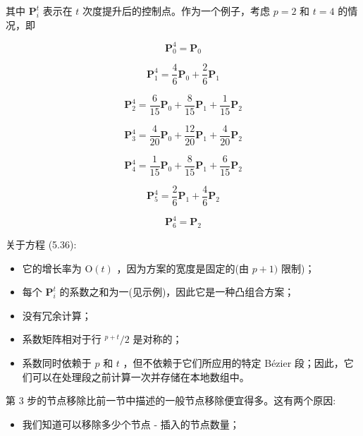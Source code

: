 \documentclass[../main.tex]{subfiles}
\begin{document}
其中 \({\mathbf{P}}_{i}^{t}\) 表示在 \(t\) 次度提升后的控制点。作为一个例子，考虑 \(p = 2\) 和 \(t = 4\) 的情况，即

\[
{\mathbf{P}}_{0}^{4} = {\mathbf{P}}_{0}
\]

\[
{\mathbf{P}}_{1}^{4} = \frac{4}{6}{\mathbf{P}}_{0} + \frac{2}{6}{\mathbf{P}}_{1}
\]

\[
{\mathbf{P}}_{2}^{4} = \frac{6}{15}{\mathbf{P}}_{0} + \frac{8}{15}{\mathbf{P}}_{1} + \frac{1}{15}{\mathbf{P}}_{2}
\]

\[
{\mathbf{P}}_{3}^{4} = \frac{4}{20}{\mathbf{P}}_{0} + \frac{12}{20}{\mathbf{P}}_{1} + \frac{4}{20}{\mathbf{P}}_{2}
\]

\[
{\mathbf{P}}_{4}^{4} = \frac{1}{15}{\mathbf{P}}_{0} + \frac{8}{15}{\mathbf{P}}_{1} + \frac{6}{15}{\mathbf{P}}_{2}
\]

\[
{\mathbf{P}}_{5}^{4} = \frac{2}{6}{\mathbf{P}}_{1} + \frac{4}{6}{\mathbf{P}}_{2}
\]

\[
{\mathbf{P}}_{6}^{4} = {\mathbf{P}}_{2}
\]

关于方程 (5.36):

\begin{itemize}
\item 它的增长率为 \(\mathrm{O}\left( t\right)\) ，因为方案的宽度是固定的(由 \(p + 1)\) 限制)；
\end{itemize}

\begin{itemize}
\item 每个 \({\mathbf{P}}_{i}^{t}\) 的系数之和为一(见示例)，因此它是一种凸组合方案；
\end{itemize}

\begin{itemize}
\item 没有冗余计算；
\end{itemize}

\begin{itemize}
\item 系数矩阵相对于行 \({}^{p + t}/2\) 是对称的；
\end{itemize}

\begin{itemize}
\item 系数同时依赖于 \(p\) 和 \(t\) ，但不依赖于它们所应用的特定 Bézier 段；因此，它们可以在处理段之前计算一次并存储在本地数组中。
\end{itemize}

第 3 步的节点移除比前一节中描述的一般节点移除便宜得多。这有两个原因:

\begin{itemize}
\item 我们知道可以移除多少个节点 - 插入的节点数量；
\end{itemize}
\end{document}

